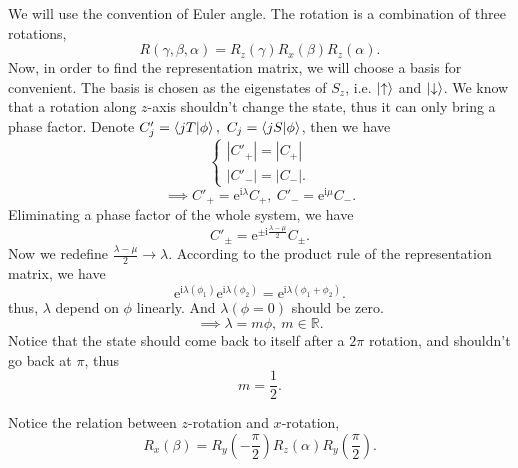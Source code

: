 We will use the convention of Euler angle. The rotation is a combination of three rotations,
\begin{equation}
    R\left( \gamma,\beta,\alpha \right) = R_z\left( \gamma \right) R_x\left( \beta \right) R_z\left( \alpha \right) .
\end{equation}
Now, in order to find the representation matrix, we will choose a basis for convenient. The basis is chosen as the eigenstates of $S_z$, i.e. $\ket{\uparrow}$ and $\ket{\downarrow}$. We know that a rotation along $z$-axis shouldn't change the state, thus it can only bring a phase factor.
Denote $C'_{j} = \bra{j T} \ket{\phi},\ C_{j} = \bra{j S}\ket{\phi}$, then we have
\begin{equation}
  \begin{cases} 
    \left| C'_{+} \right| = \left| C_{+} \right|
    \\ 
    \left| C'_{-} \right| = \left| C_{-} \right| .
  \end{cases}
\end{equation}
\begin{equation}
  \implies C'_{+} = \mathrm{e}^{\mathrm{i} \lambda} C_{+},\ C'_{-} = \mathrm{e}^{\mathrm{i} \mu} C_{-}.
\end{equation}
Eliminating a phase factor of the whole system, we have
\begin{equation}
  C'_{\pm } = \mathrm{e}^{\pm \mathrm{i} \frac{\lambda - \mu}{2}} C_{\pm }.
\end{equation}
Now we redefine $\frac{\lambda - \mu}{2} \rightarrow\lambda$.
According to the product rule of the representation matrix, we have
\begin{equation}
  \mathrm{e}^{\mathrm{i} \lambda \left( \phi_1 \right) } \mathrm{e}^{\mathrm{i} \lambda \left( \phi_2 \right) } = \mathrm{e}^{\mathrm{i} \lambda \left( \phi_1 + \phi_2 \right) } .
\end{equation}
thus, $\lambda$ depend on $\phi$ linearly. And $\lambda \left( \phi = 0 \right) $ should be zero.
\begin{equation}
  \implies \lambda = m \phi,\ m \in \mathbb{R}.
\end{equation}
Notice that the state should come back to itself after a $2\pi$ rotation, and shouldn't go back at $\pi$, thus
\begin{equation}
  m = \frac{1}{2}.
\end{equation}

Notice the relation between $z$-rotation and $x$-rotation,
\begin{equation}
  R_x \left( \beta \right) = R_y \left( -\frac{\pi}{2} \right) R_z\left( \alpha \right) R_y\left( \frac{\pi}{2} \right) .
\end{equation}

